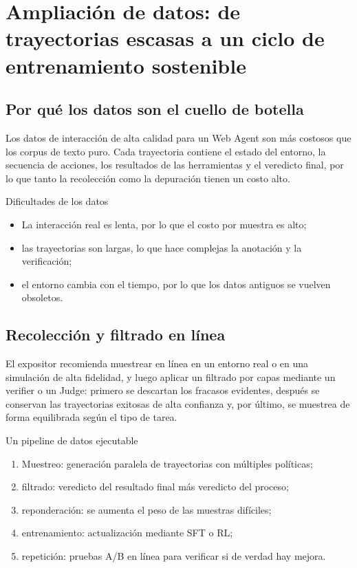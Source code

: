 \section{Ampliación de datos: de trayectorias escasas a un ciclo de entrenamiento sostenible}

\subsection{Por qué los datos son el cuello de botella}
Los datos de interacción de alta calidad para un Web Agent son más costosos que los corpus de texto puro. Cada trayectoria contiene el estado del entorno, la secuencia de acciones, los resultados de las herramientas y el veredicto final, por lo que tanto la recolección como la depuración tienen un costo alto.

\begin{importantbox}{Dificultades de los datos}
\begin{itemize}
    \item La interacción real es lenta, por lo que el costo por muestra es alto;
    \item las trayectorias son largas, lo que hace complejas la anotación y la verificación;
    \item el entorno cambia con el tiempo, por lo que los datos antiguos se vuelven obsoletos.
\end{itemize}
\end{importantbox}

\subsection{Recolección y filtrado en línea}
El expositor recomienda muestrear en línea en un entorno real o en una simulación de alta fidelidad, y luego aplicar un filtrado por capas mediante un verifier o un Judge: primero se descartan los fracasos evidentes, después se conservan las trayectorias exitosas de alta confianza y, por último, se muestrea de forma equilibrada según el tipo de tarea.

\begin{knowledgebox}{Un pipeline de datos ejecutable}
\begin{enumerate}
    \item Muestreo: generación paralela de trayectorias con múltiples políticas;
    \item filtrado: veredicto del resultado final más veredicto del proceso;
    \item reponderación: se aumenta el peso de las muestras difíciles;
    \item entrenamiento: actualización mediante SFT o RL;
    \item repetición: pruebas A/B en línea para verificar si de verdad hay mejora.
\end{enumerate}
\end{knowledgebox}

